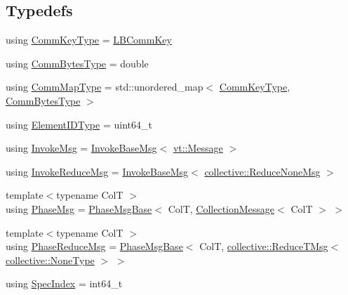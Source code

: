 \subsection*{Typedefs}
\begin{DoxyCompactItemize}
\item 
using \hyperlink{namespacevt_1_1vrt_1_1collection_1_1balance_a01c9a1060d83d052604a3ff12918033a}{Comm\+Key\+Type} = \hyperlink{structvt_1_1vrt_1_1collection_1_1balance_1_1_l_b_comm_key}{L\+B\+Comm\+Key}
\item 
using \hyperlink{namespacevt_1_1vrt_1_1collection_1_1balance_a0772d7dd137393e9874b9f8caa96d420}{Comm\+Bytes\+Type} = double
\item 
using \hyperlink{namespacevt_1_1vrt_1_1collection_1_1balance_aa50d4cbbfa3c643e7303fc6e08f411fb}{Comm\+Map\+Type} = std\+::unordered\+\_\+map$<$ \hyperlink{namespacevt_1_1vrt_1_1collection_1_1balance_a01c9a1060d83d052604a3ff12918033a}{Comm\+Key\+Type}, \hyperlink{namespacevt_1_1vrt_1_1collection_1_1balance_a0772d7dd137393e9874b9f8caa96d420}{Comm\+Bytes\+Type} $>$
\item 
using \hyperlink{namespacevt_1_1vrt_1_1collection_1_1balance_a14c8d2c972f2913aa3f1636e5be0a120}{Element\+I\+D\+Type} = uint64\+\_\+t
\item 
using \hyperlink{namespacevt_1_1vrt_1_1collection_1_1balance_a20d9331394b59e8a64e4616d22fa4f18}{Invoke\+Msg} = \hyperlink{structvt_1_1vrt_1_1collection_1_1balance_1_1_invoke_base_msg}{Invoke\+Base\+Msg}$<$ \hyperlink{namespacevt_a3a3ddfef40b4c90915fa43cdd5f129ea}{vt\+::\+Message} $>$
\item 
using \hyperlink{namespacevt_1_1vrt_1_1collection_1_1balance_ace206d13ca2e76a7622176bb08e1e3e0}{Invoke\+Reduce\+Msg} = \hyperlink{structvt_1_1vrt_1_1collection_1_1balance_1_1_invoke_base_msg}{Invoke\+Base\+Msg}$<$ \hyperlink{namespacevt_1_1collective_aa439a90f05078f2bcf918641c951946f}{collective\+::\+Reduce\+None\+Msg} $>$
\item 
{\footnotesize template$<$typename ColT $>$ }\\using \hyperlink{namespacevt_1_1vrt_1_1collection_1_1balance_a7120dc064f6e8c4157a5f4c81b825393}{Phase\+Msg} = \hyperlink{structvt_1_1vrt_1_1collection_1_1balance_1_1_phase_msg_base}{Phase\+Msg\+Base}$<$ ColT, \hyperlink{structvt_1_1vrt_1_1collection_1_1_collection_message}{Collection\+Message}$<$ ColT $>$ $>$
\item 
{\footnotesize template$<$typename ColT $>$ }\\using \hyperlink{namespacevt_1_1vrt_1_1collection_1_1balance_a04cf83e524629461fafc8d349af8ac8a}{Phase\+Reduce\+Msg} = \hyperlink{structvt_1_1vrt_1_1collection_1_1balance_1_1_phase_msg_base}{Phase\+Msg\+Base}$<$ ColT, \hyperlink{namespacevt_1_1collective_a28b82d5d48c9bc6e4fd738fcbf9e0f62}{collective\+::\+Reduce\+T\+Msg}$<$ \hyperlink{namespacevt_1_1collective_af988b64711231f96d33ebfaf891e52a4}{collective\+::\+None\+Type} $>$ $>$
\item 
using \hyperlink{namespacevt_1_1vrt_1_1collection_1_1balance_a72a5e0d9936ddf57f8e6c64e0e9fd123}{Spec\+Index} = int64\+\_\+t
\end{DoxyCompactItemize}
